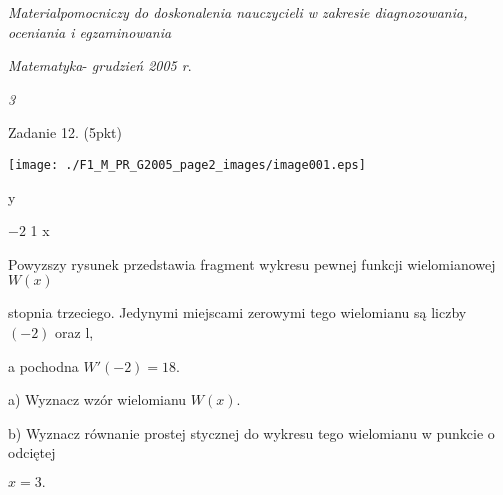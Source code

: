 \documentclass[a4paper,12pt]{article}
\begin{document}
{\it Materialpomocniczy do doskonalenia nauczycieli w zakresie diagnozowania, oceniania i egzaminowania}

{\it Matematyka}- {\it grudzień 2005 r}.

{\it 3}

Zadanie 12. (5pkt)
\begin{center}
\texttt{[image: ./F1\_M\_PR\_G2005\_page2\_images/image001.eps]}
\end{center}
y

$-2$  1  x

Powyzszy rysunek przedstawia fragment wykresu pewnej funkcji wielomianowej $W(x)$

stopnia trzeciego. Jedynymi miejscami zerowymi tego wielomianu są liczby $(-2)$ oraz l,

a pochodna $W'(-2)=18.$

a) Wyznacz wzór wielomianu $W(x).$

b) Wyznacz równanie prostej stycznej do wykresu tego wielomianu w punkcie o odciętej

$x=3.$
\end{document}
